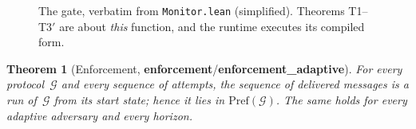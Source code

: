 \documentclass[10pt,twocolumn]{article}
\newtheorem{theorem}{Theorem}
\newcommand{\G}{\mathcal{G}}
\newcommand{\code}[1]{\texttt{\small #1}}
\newcommand{\thm}[1]{\textcolor{dk}{\textbf{#1}}}
\begin{document}
\begin{figure}[t]
\footnotesize\setlength{\fboxsep}{4pt}
\vspace{-1ex}
\caption{The gate, verbatim from \code{Monitor.lean} (simplified). Theorems T1--T3$'$ are about \emph{this}
function, and the runtime executes its compiled form.}
\label{fig:step}
\vspace{-1.5ex}
\end{figure}

\begin{theorem}[Enforcement, \thm{enforcement}/\thm{enforcement\_adaptive}]
For every protocol~$\G$ and every sequence of attempts, the sequence of delivered messages is a run of~$\G$
from its start state; hence it lies in $\mathrm{Pref}(\G)$. The same holds for every adaptive adversary and
every horizon.
\end{theorem}
\end{document}
